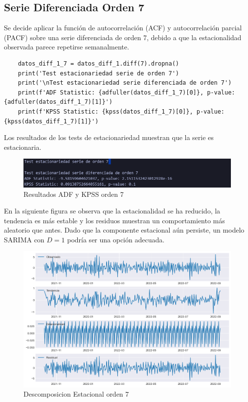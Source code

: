 \subsection{Serie Diferenciada Orden 7}
Se decide aplicar la función de autocorrelación (ACF) y autocorrelación parcial (PACF) sobre una serie diferenciada de orden 7, debido a que la estacionalidad observada parece repetirse semanalmente.

\begin{lstlisting}
	datos_diff_1_7 = datos_diff_1.diff(7).dropna()
	print('Test estacionariedad serie de orden 7')
	print('\nTest estacionariedad serie diferenciada de orden 7')
	print(f'ADF Statistic: {adfuller(datos_diff_1_7)[0]}, p-value: {adfuller(datos_diff_1_7)[1]}')
	print(f'KPSS Statistic: {kpss(datos_diff_1_7)[0]}, p-value: {kpss(datos_diff_1_7)[1]}')
\end{lstlisting}

Los resultados de los tests de estacionariedad muestran que la serie es estacionaria.
\begin{figure}[h]
	\centering
	\includegraphics[width=0.7\linewidth]{orden7_fuller}
	\caption{Resultados ADF y KPSS orden 7}
	\label{fig:orden7fuller}
\end{figure}

En la siguiente figura se observa que la estacionalidad se ha reducido, la tendencia es más estable y los residuos muestran un comportamiento más aleatorio que antes.
Dado que la componente estacional aún persiste, un modelo SARIMA con $D = 1$ podría ser una opción adecuada.

\begin{figure}[h]
	\centering
	\includegraphics[width=0.7\linewidth]{seasonal_decompose_plot_diff_7}
	\caption{Descomposicion Estacional orden 7}
	\label{fig:seasonaldecomposeplotdiff7}
\end{figure}

